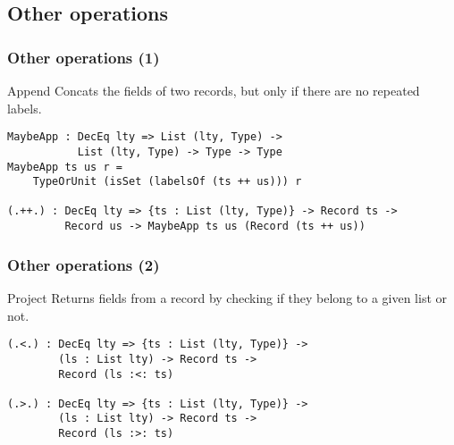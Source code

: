 \documentclass{beamer}
\begin{document}
\subsection{Other operations}

\begin{frame}[fragile]
\frametitle{Other operations (1)}

\begin{block}{Append}
Concats the fields of two records, but only if there are no repeated labels.

\begin{definition}
\begin{verbatim}
MaybeApp : DecEq lty => List (lty, Type) ->
           List (lty, Type) -> Type -> Type
MaybeApp ts us r = 
    TypeOrUnit (isSet (labelsOf (ts ++ us))) r

(.++.) : DecEq lty => {ts : List (lty, Type)} -> Record ts -> 
         Record us -> MaybeApp ts us (Record (ts ++ us))
\end{verbatim}
\end{definition}

\end{block}

\end{frame}

\begin{frame}[fragile]
\frametitle{Other operations (2)}

\begin{block}{Project}
Returns fields from a record by checking if they belong to a given list or not.

\begin{definition}
\begin{verbatim}
(.<.) : DecEq lty => {ts : List (lty, Type)} -> 
        (ls : List lty) -> Record ts -> 
        Record (ls :<: ts)

(.>.) : DecEq lty => {ts : List (lty, Type)} -> 
        (ls : List lty) -> Record ts -> 
        Record (ls :>: ts)
\end{verbatim}
\end{definition}

\end{block}

\end{frame}
\end{document}

